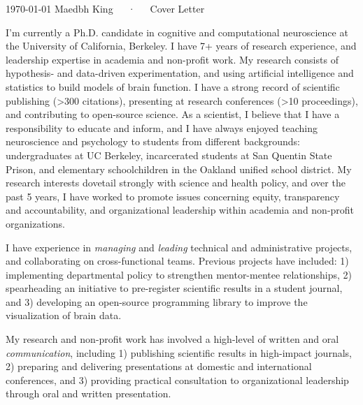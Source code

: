 \documentclass[11pt, a4paper]{maedbh-cv}
\begin{document}
\makecvheader[R]

\makecvfooter
  {\today}
  {Maedbh King~~~·~~~Cover Letter}
  {}

\makelettertitle

\begin{cvletter}

I'm currently a Ph.D. candidate in cognitive and computational neuroscience at the University of California, Berkeley. I have 7+ years of research experience, and leadership expertise in academia and non-profit work. My research consists of hypothesis‐ and data-driven experimentation, and using artificial intelligence and statistics to build models of brain function. I have a strong record of scientific publishing (>300 citations), presenting at research conferences (>10 proceedings), and contributing to open-source science. 
	As a scientist, I believe that I have a responsibility to educate and inform, and I have always enjoyed teaching neuroscience and psychology to students from different backgrounds: undergraduates at UC Berkeley, incarcerated students at San Quentin State Prison, and elementary schoolchildren in the Oakland unified school district. 
	My research interests dovetail strongly with science and health policy, and over the past 5 years, I have worked to promote issues concerning equity, transparency and accountability, and organizational leadership within academia and non-profit organizations. 



I have experience in \textit{managing} and \textit{leading} technical and administrative projects, and collaborating on cross-functional teams. Previous projects have included: 1) implementing departmental policy to strengthen mentor-mentee relationships, 2) spearheading an initiative to pre-register scientific results in a student journal, and 3) developing an open-source programming library to improve the visualization of brain data. 

	My research and non-profit work has involved a high-level of written and oral \textit{communication}, including 1) publishing scientific results in high-impact journals, 2) preparing and delivering presentations at domestic and international conferences, and 3) providing practical consultation to organizational leadership through oral and written presentation. 


\end{cvletter}
\end{document}
